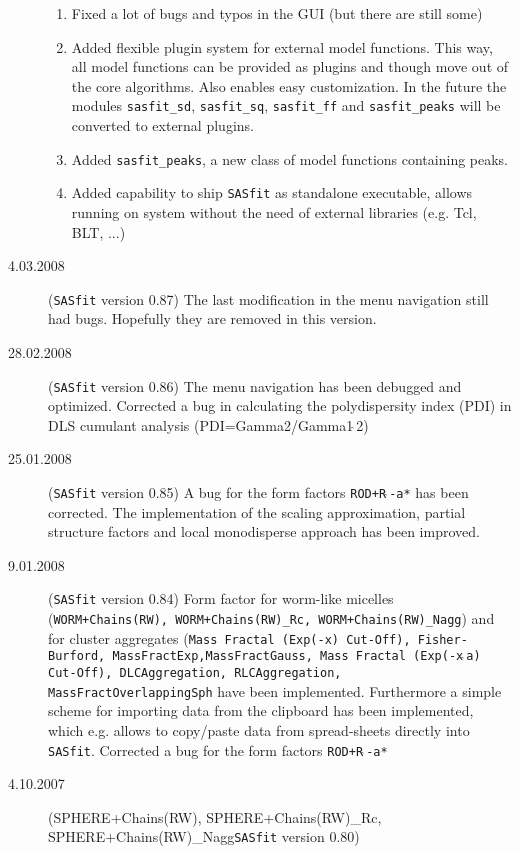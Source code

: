 \begin{description}
\begin{enumerate}
        \item Fixed a lot of bugs and typos in the GUI (but there are still some)
        \item Added flexible plugin system for external model functions. This way, all model functions can be provided
                as plugins and though move out of the core algorithms. Also enables easy customization. In the future
                the modules \texttt{sasfit\_sd}, \texttt{sasfit\_sq}, \texttt{sasfit\_ff} and \texttt{sasfit\_peaks}
                will be converted to external plugins.
        \item Added \texttt{sasfit\_peaks}, a new class of model functions containing peaks.
        \item Added capability to ship {\tt SASfit} as standalone executable, allows running on system without the
                need of external libraries (e.g. Tcl, BLT, ...)
    \end{enumerate}
    \item[4.03.2008] ({\tt SASfit} version 0.87) The last
    modification in the menu navigation still had bugs. Hopefully
    they are removed in this version.
    \item[28.02.2008] ({\tt SASfit} version 0.86)
    The menu navigation has been debugged and optimized.
    Corrected a bug in calculating the polydispersity index (PDI)
    in DLS cumulant analysis (PDI=Gamma2/Gamma1$\hat{~}$2)
    \item[25.01.2008] ({\tt SASfit} version 0.85)
    A bug for the form factors  \texttt{ROD+R$\hat{~}$-a*} has
    been corrected. The implementation of the scaling
    approximation, partial structure factors and local monodisperse
    approach has been improved.
    \item[9.01.2008] ({\tt SASfit} version 0.84) Form factor for
    worm-like micelles (\texttt{WORM+Chains(RW), WORM+Chains(RW)\_Rc,
    WORM+Chains(RW)\_Nagg}) and for cluster aggregates
    (\texttt{Mass Fractal (Exp(-x) Cut-Off), Fisher-Burford,
    MassFractExp,MassFractGauss, Mass Fractal (Exp(-x$\hat{~}$a) Cut-Off), DLCAggregation,
    RLCAggregation, MassFractOverlappingSph} have been implemented. Furthermore a simple scheme for importing data
    from the clipboard has been implemented, which e.g. allows to copy/paste
    data from spread-sheets directly into {\tt SASfit}.
    Corrected a bug for the form factors  \texttt{ROD+R$\hat{~}$-a*}
    \item[4.10.2007] ({SPHERE+Chains(RW), SPHERE+Chains(RW)\_Rc, SPHERE+Chains(RW)\_Nagg\tt SASfit} version 0.80)

\end{description}
